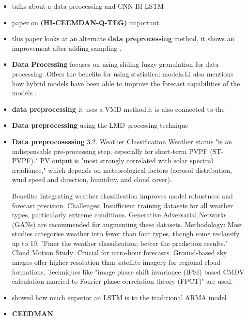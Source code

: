  \newpage
 \begin{itemize}
 \item \cite{wang2023short} talks about a data preocessing and CNN-BI-LSTM
 \item	paper on \textbf{(HI-CEEMDAN-Q-TEG) } \cite{hiceemdanQteg} important
 \item  this paper looks at an alternate\textbf{ data preprocessing} method, it shows an improvement after adding sampling  \cite{wang2023improving}.
 \item \textbf{Data Processing} focuses on using sliding fuzzy granulation for data processing \cite{li2023short}.Offers the benefits for using statistical models.Li also mentions how hybrid models have been able to improve the forecast capabilities of the models .
 \item \textbf{data preprocessing} \cite{he2019hybrid} it uses a VMD method.it is also connected to the \cite{hiceemdanQteg}
 \item \textbf{Data preprocessing} \cite{wang2019novel} using the LMD processing technique 
 \item\textbf{ Data preprocosessing} \cite{ahmed2020review} 3.2. Weather Classification
 Weather status "is an indispensable pre-processing step, especially for short-term PVPF (ST-PVPF)." PV output is "most strongly correlated with solar spectral irradiance," which depends on meteorological factors (aerosol distribution, wind speed and direction, humidity, and cloud cover).
 
 Benefits: Integrating weather classification improves model robustness and forecast precision.
 Challenges: Insufficient training datasets for all weather types, particularly extreme conditions. Generative Adversarial Networks (GANs) are recommended for augmenting these datasets.
 Methodology: Most studies categorise weather into fewer than four types, though some reclassify up to 10. "Finer the weather classification; better the prediction results."
 Cloud Motion Study: Crucial for intra-hour forecasts. Ground-based sky images offer higher resolution than satellite imagery for regional cloud formations. Techniques like "image phase shift invariance (IPSI) based CMDV calculation married to Fourier phase correlation theory (FPCT)" are used.
 \item \cite{tshipata2024multi} showed how much superior an LSTM is to the traditional ARMA model
 \item \cite{li2023ultra}  \textbf{CEEDMAN}
 
 \end{itemize}
 


